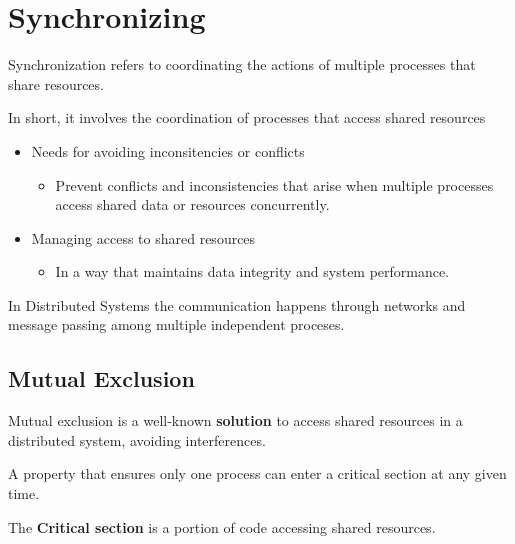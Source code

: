 \chapter{Synchronizing}

Synchronization refers to coordinating the actions of multiple processes that share resources.

In short, it involves the coordination of processes that access shared resources
\begin{itemize}
   \item Needs for avoiding inconsitencies or conflicts
   \begin{itemize}
      \item Prevent conflicts and inconsistencies that
      arise when multiple processes access
      shared data or resources concurrently.
   \end{itemize}
   \item Managing access to shared resources
   \begin{itemize}
      \item In a way that maintains data integrity and
      system performance.
   \end{itemize}
\end{itemize}

In Distributed Systems the communication happens through networks and message passing among multiple independent proceses.

\section{Mutual Exclusion}
Mutual exclusion is a well-known \textbf{solution} to access shared resources in a distributed system, avoiding interferences.

\begin{definition}
   A property that ensures only one process can enter a critical section at any given time.
\end{definition}
The \textbf{Critical section} is a portion of code accessing shared resources.


